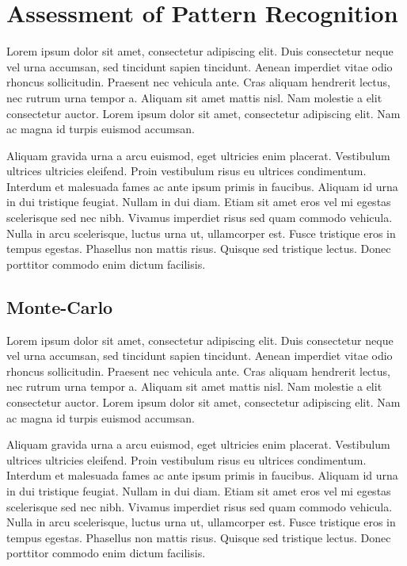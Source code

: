 \section{Assessment of Pattern Recognition}

Lorem ipsum dolor sit amet, consectetur adipiscing elit. Duis consectetur neque vel urna accumsan, sed tincidunt sapien tincidunt. Aenean imperdiet vitae odio rhoncus sollicitudin. Praesent nec vehicula ante. Cras aliquam hendrerit lectus, nec rutrum urna tempor a. Aliquam sit amet mattis nisl. Nam molestie a elit consectetur auctor. Lorem ipsum dolor sit amet, consectetur adipiscing elit. Nam ac magna id turpis euismod accumsan.

Aliquam gravida urna a arcu euismod, eget ultricies enim placerat. Vestibulum ultrices ultricies eleifend. Proin vestibulum risus eu ultrices condimentum. Interdum et malesuada fames ac ante ipsum primis in faucibus. Aliquam id urna in dui tristique feugiat. Nullam in dui diam. Etiam sit amet eros vel mi egestas scelerisque sed nec nibh. Vivamus imperdiet risus sed quam commodo vehicula. Nulla in arcu scelerisque, luctus urna ut, ullamcorper est. Fusce tristique eros in tempus egestas. Phasellus non mattis risus. Quisque sed tristique lectus. Donec porttitor commodo enim dictum facilisis.

\subsection{Monte-Carlo}

Lorem ipsum dolor sit amet, consectetur adipiscing elit. Duis consectetur neque vel urna accumsan, sed tincidunt sapien tincidunt. Aenean imperdiet vitae odio rhoncus sollicitudin. Praesent nec vehicula ante. Cras aliquam hendrerit lectus, nec rutrum urna tempor a. Aliquam sit amet mattis nisl. Nam molestie a elit consectetur auctor. Lorem ipsum dolor sit amet, consectetur adipiscing elit. Nam ac magna id turpis euismod accumsan.

Aliquam gravida urna a arcu euismod, eget ultricies enim placerat. Vestibulum ultrices ultricies eleifend. Proin vestibulum risus eu ultrices condimentum. Interdum et malesuada fames ac ante ipsum primis in faucibus. Aliquam id urna in dui tristique feugiat. Nullam in dui diam. Etiam sit amet eros vel mi egestas scelerisque sed nec nibh. Vivamus imperdiet risus sed quam commodo vehicula. Nulla in arcu scelerisque, luctus urna ut, ullamcorper est. Fusce tristique eros in tempus egestas. Phasellus non mattis risus. Quisque sed tristique lectus. Donec porttitor commodo enim dictum facilisis.

